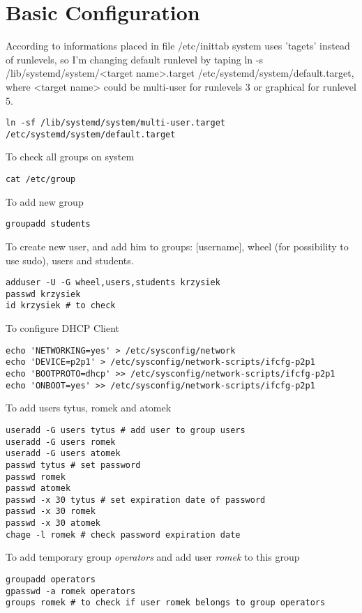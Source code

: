 \documentclass[a4paper,12pt]{article}
\begin{document}
    \section{Basic Configuration}
    

    According to informations placed in file /etc/inittab system uses 'tagets' instead of runlevels, so I'm changing default runlevel by taping ln -s /lib/systemd/system/<target name>.target 
/etc/systemd/system/default.target, where <target name> could be multi-user for runlevels 3 or graphical for runlevel 5. 

    \begin{lstlisting}[frame=single]
ln -sf /lib/systemd/system/multi-user.target /etc/systemd/system/default.target
    \end{lstlisting}
    To check all groups on system
    \begin{lstlisting}[frame=single]
cat /etc/group
    \end{lstlisting}
    To add new group 
    \begin{lstlisting}[frame=single]
groupadd students
    \end{lstlisting}
    To create new user, and add him to groups: [username], wheel (for possibility to use sudo), users and students. 
    \begin{lstlisting}[frame=single]
adduser -U -G wheel,users,students krzysiek
passwd krzysiek
id krzysiek # to check
    \end{lstlisting}
    To configure  DHCP Client
    \begin{lstlisting}[frame=single]
echo 'NETWORKING=yes' > /etc/sysconfig/network 
echo 'DEVICE=p2p1' > /etc/sysconfig/network-scripts/ifcfg-p2p1 
echo 'BOOTPROTO=dhcp' >> /etc/sysconfig/network-scripts/ifcfg-p2p1 
echo 'ONBOOT=yes' >> /etc/sysconfig/network-scripts/ifcfg-p2p1 
    \end{lstlisting}
    To add users tytus, romek and atomek
    \begin{lstlisting}[frame=single]
useradd -G users tytus # add user to group users 
useradd -G users romek 
useradd -G users atomek 
passwd tytus # set password
passwd romek
passwd atomek
passwd -x 30 tytus # set expiration date of password  
passwd -x 30 romek 
passwd -x 30 atomek 
chage -l romek # check password expiration date
    \end{lstlisting}
    To add temporary group \emph{operators} and add user \emph{romek} to this group
    \begin{lstlisting}[frame=single]
groupadd operators 
gpasswd -a romek operators
groups romek # to check if user romek belongs to group operators
    \end{lstlisting}
\end{document}
